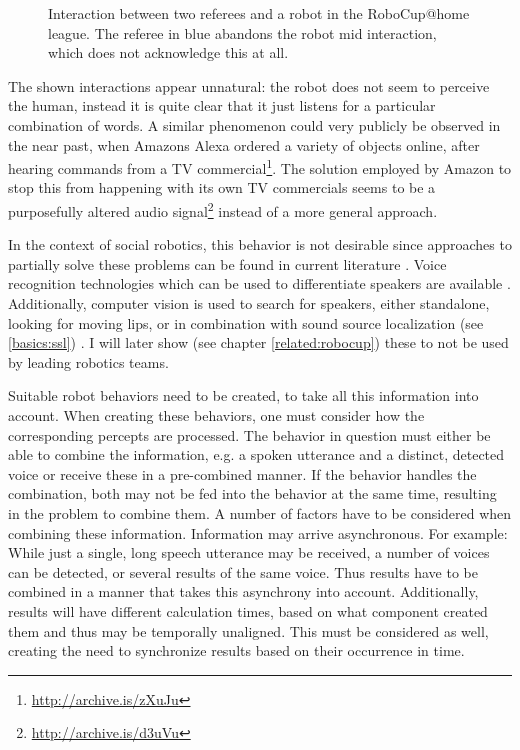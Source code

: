 \begin{figure}[]
	\caption{Interaction between two referees and a robot in the RoboCup@home league.
		The referee in blue abandons the robot mid interaction, which does not acknowledge this at all.}
	\label{pic:moti:imustgonow}
\end{figure}

The shown interactions appear unnatural:
the robot does not seem to perceive the human, instead it is quite clear that it just listens for a particular combination of words.
A similar phenomenon could very publicly be observed in the near past, when Amazons Alexa ordered a variety of objects online, after hearing commands from a  TV commercial\footnote{\url{http://archive.is/zXuJu}}.
The solution employed by Amazon to stop this from happening with its own TV commercials seems to be a purposefully altered audio signal\footnote{\url{http://archive.is/d3uVu}} instead of a more general approach.

In the context of social robotics, this behavior is not desirable since approaches to partially solve these problems can be found in current literature \cite{opdenAkker:2009:YAR:1708376.1708379}.
Voice recognition technologies which can be used to differentiate speakers are available \cite{DBLP:journals/corr/abs-1003-4083}.
Additionally, computer vision is used to search for speakers, either standalone, looking for moving lips, or in combination with sound source localization (see \ref{basics:ssl}) \cite{1048137,lookwhostalking,840663,whosaidthat}.
I will later show (see chapter \ref{related:robocup}) these to not be used by leading robotics teams.

Suitable robot behaviors need to be created, to take all this information into account.
When creating these behaviors, one must consider how the corresponding percepts are processed.
The behavior in question must either be able to combine the information, e.g. a spoken utterance and a distinct, detected voice or receive these in a pre-combined manner.
If the behavior handles the combination, both may not be fed into the behavior at the same time, resulting in the problem to combine them.
A number of factors have to be considered when combining these information.
Information may arrive asynchronous.
For example: While just a single, long speech utterance may be received, a number of voices can be detected, or several results of the same voice.
Thus results have to be combined in a manner that takes this asynchrony into account.
Additionally, results will have different calculation times, based on what component created them and thus may be temporally unaligned.
This must be considered as well, creating the need to synchronize results based on their occurrence in time.

